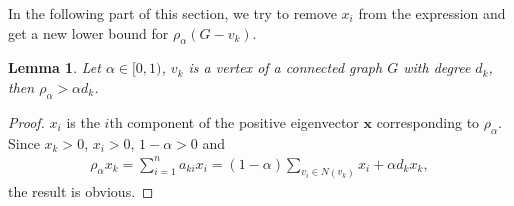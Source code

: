 \documentclass[amsthm]{elsart}
\newtheorem{lemma}{Lemma}[section]
\begin{document}
In the following part of this section, we try to remove $x_i$ from the expression and get a new lower bound for $\rho _\alpha(G-v_k)$.

\begin{lemma} \label{lem:1}
Let $\alpha \in [0, 1)$, $v_k$ is a vertex of a connected graph $G$ with degree $d_k$, then $\rho _\alpha > \alpha d_k$.
\end{lemma}
\begin{proof}
$x_i$ is the $i$th component of the positive eigenvector $\textbf{x}$ corresponding to $\rho_\alpha$. Since $x_k > 0$, $x_i > 0$, $1-\alpha > 0$ and
\begin{eqnarray*}
\rho _\alpha x_k = \sum \limits_{i = 1}^{n} a_{ki} x_i = (1 - \alpha) \sum \limits_{v_i \in N(v_k)}^{} x_i + \alpha d_k x_k ,
\end{eqnarray*}
the result is obvious.
\end{proof}
\end{document}
